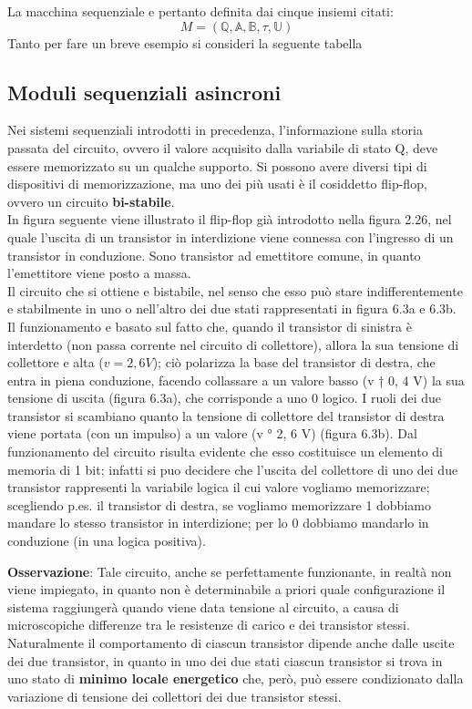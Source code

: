 \documentclass[a4paper]{extarticle}
\begin{document}
\vspace{1em}
\noindent
La macchina sequenziale e pertanto definita dai cinque insiemi citati:
\[M = \left(\mathbb{Q}, \mathbb{A}, \mathbb{B}, \tau, \mathbb{U} \right)\]
Tanto per fare un breve esempio si consideri la seguente tabella

\subsection{Moduli sequenziali asincroni}
Nei sistemi sequenziali introdotti in precedenza, l’informazione sulla storia passata del circuito, ovvero il valore acquisito dalla variabile di stato Q, deve essere memorizzato su un qualche supporto. Si possono
avere diversi tipi di dispositivi di memorizzazione, ma uno dei più usati è il cosiddetto flip-flop, ovvero un circuito \textbf{bi-stabile}.\\
In figura seguente viene illustrato il flip-flop già introdotto nella figura 2.26, nel quale l’uscita di un transistor in interdizione viene connessa con l’ingresso di un transistor in conduzione. Sono transistor ad emettitore comune, in quanto l'emettitore viene posto a massa.\\
Il circuito che si ottiene e bistabile, nel senso che esso può stare indifferentemente e stabilmente in uno o nell'altro dei due stati rappresentati in figura 6.3a e 6.3b. Il funzionamento e basato sul fatto che, quando il transistor di sinistra è interdetto (non passa corrente nel circuito di collettore), allora la sua tensione di collettore e alta (\(v = 2,6 V\)); ciò polarizza la base del transistor di destra, che entra in
piena conduzione, facendo collassare a un valore basso (v † 0, 4 V) la sua tensione di uscita (figura 6.3a), che
corrisponde a uno 0 logico. I ruoli dei due transistor si scambiano quanto la tensione di collettore del transistor di
destra viene portata (con un impulso) a un valore (v ° 2, 6 V) (figura 6.3b). Dal funzionamento del circuito risulta
evidente che esso costituisce un elemento di memoria di 1 bit; infatti si puo decidere che l’uscita del collettore
di uno dei due transistor rappresenti la variabile logica il cui valore vogliamo memorizzare; scegliendo p.es. il
transistor di destra, se vogliamo memorizzare 1 dobbiamo mandare lo stesso transistor in interdizione; per lo 0
dobbiamo mandarlo in conduzione (in una logica positiva).

\vspace{1em}
\noindent
\textbf{Osservazione}: Tale circuito, anche se perfettamente funzionante, in realtà non viene impiegato, in quanto non è determinabile a priori quale configurazione il sistema raggiungerà quando viene data tensione al circuito, a causa di microscopiche differenze tra le resistenze di carico e dei transistor stessi.\\
Naturalmente il comportamento di ciascun transistor dipende anche dalle uscite dei due transistor, in quanto in uno dei due stati ciascun transistor si trova in uno stato di \textbf{minimo locale energetico} che, però, può essere condizionato dalla variazione di tensione dei collettori dei due transistor stessi.
\end{document}
